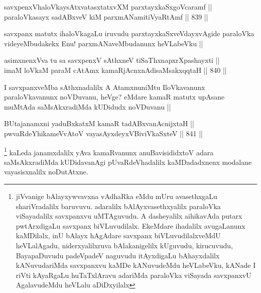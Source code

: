\begin{shl}
savxpenxVhaloVkaysAtxvatasxtatxvXM parxtayxkaSxgoVcaramf || \\
paraloVkasayx sadABxveV kiM parxmANamitiVyaRtAmf ||  839 ||  
\end{shl}

\begin{artha}
savxpanx matutx ihaloVkagaLu iruvudu parxtayxkaSxveVdayxvAgide paraloVka videyeMbudakekx Enu! parxmANaveMbudanunx heVLabeVku ||
\end{artha}


\begin{shl}
asimxnenxVva tu sa savxpenxV sAthxneV tiSaThxnapxrXpashayxti ||  \\
imaM loVkaM paraM cA\s \s tAmx kamaRjAcnxnAdisaMsakxqqtaH ||  840 ||  
\end{shl}

\begin{artha}
I savxpanxveMba sAthxnadalilx A AtamxnuniMtu IloVkavanunx paraloVkavanunx noVDuvanu, heVge? eMdare kamaR matutx upAsane muMtAda saMsAkxradiMda kUDidudx noVDuvanu ||
\end{artha}


\begin{shl}
BUtajanamxni yaduBxkatxM kamaR tadABxvanAcnijxtaH || \\
pwvaRdeYhikameVvAtoV vayasAyxdeyxV\s BiviVkaSxteV ||  841 ||  
\end{shl}

\begin{artha}
\footnote{jiVvanige bAlayxywvavxna vAdhaRka eMdu mUru avasethxgaLu shariVradalilx baruvuvu. adaralilx bAlAyxvasethxyalilx paraloVka viSayadalilx savxpanxvu uMTAguvudu. A dasheyalilx aihikavAda putarx pwtArxdigaLu savxpanx biVLuvudilalx. EkeMdare ihadalilx avugaLanunx kaMDilalx, inU bAlayx hAgAdare savxpanx biVLuvudilalxveMdU heVLalAgadu, niderxyalilxruva bAlakanigelilx kUguvudu, kirucuvudu, BayapaDuvudu padeVpadeV naguvudu itAyxdigaLu bAhayxdalilx kANuvudariMda savxpanxvu kaMDe kANuvudeMdu heVLabeVku, kANade I riVti kAyaRgaLu huTaTxlAravu adariMda paraloVka viSayada savxpanxvU AgalavudeMdu heVLalu aDiDxyilalx}
kaLeda janamxdalilx yAva kamaRvanunx anuBavisididxtoV adara saMsAkxradiMda kUDidavanAgi pUvaRdeVhadalilx kaMDadadxnenx modalane vayasisxnalilx noDutAtxne.
\end{artha}

